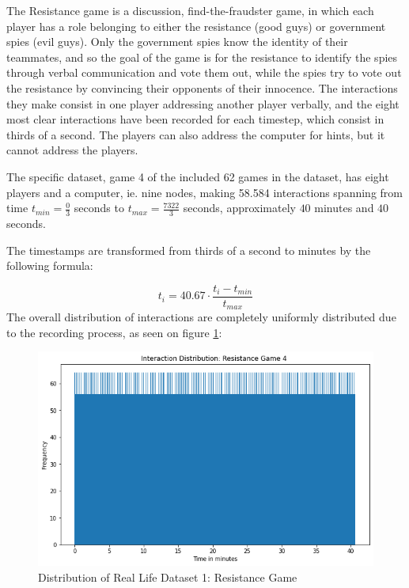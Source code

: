 The Resistance game is a discussion, find-the-fraudster game, in which each player has a role belonging to either the resistance (good guys) or government spies (evil guys).
Only the government spies know the identity of their teammates, and so the goal of the game is for the resistance to identify the spies through verbal communication and vote them out, while the spies try to vote out the resistance by convincing their opponents of their innocence. 
The interactions they make consist in one player addressing another player verbally, and the eight most clear interactions have been recorded for each timestep, which consist in thirds of a second. 
The players can also address the computer for hints, but it cannot address the players.

The specific dataset, game 4 of the included 62 games in the dataset, has eight players and a computer, ie. nine nodes, making 58.584 interactions spanning from time $t_{min} = \frac{0}{3}$ seconds to $t_{max} = \frac{7322}{3}$ seconds, approximately $40$ minutes and $40$ seconds.

The timestamps are transformed from thirds of a second to minutes by the following formula:

\begin{equation}
    t_i = 40.67 \cdot \frac{t_i - t_{min}}{t_{max}}
\end{equation}
The overall distribution of interactions are completely uniformly distributed due to the recording process, as seen on figure \ref{fig:RLdataset1}: 

\begin{figure}[H]
    \centering
    \includegraphics[width=\textwidth]{0_images/real_dataset_1_dist.png}
    \caption{Distribution of Real Life Dataset 1: Resistance Game}
    \label{fig:RLdataset1}
\end{figure}



